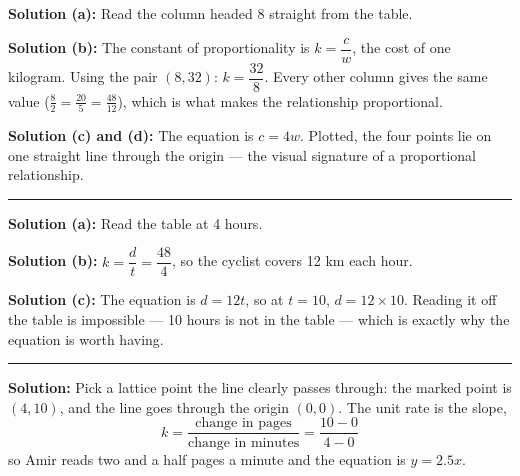 \documentclass[12pt]{article}
\begin{document}




\textbf{Solution (a):} Read the column headed 8 straight from the table.

\textbf{Solution (b):} The constant of proportionality is $k = \dfrac{c}{w}$, the cost
of one kilogram. Using the pair $(8, 32)$: $k = \dfrac{32}{8}$. Every other column
gives the same value ($\tfrac{8}{2} = \tfrac{20}{5} = \tfrac{48}{12}$), which is what
makes the relationship proportional.

\textbf{Solution (c) and (d):} The equation is $c = 4w$. Plotted, the four points
lie on one straight line through the origin --- the visual signature of a
proportional relationship.

\vspace{0.2cm}\noindent\rule{\linewidth}{0.2pt}


\textbf{Solution (a):} Read the table at 4 hours.

\textbf{Solution (b):} $k = \dfrac{d}{t} = \dfrac{48}{4}$, so the cyclist covers
12 km each hour.

\textbf{Solution (c):} The equation is $d = 12t$, so at $t = 10$,
$d = 12 \times 10$. Reading it off the table is impossible --- 10 hours is not in the
table --- which is exactly why the equation is worth having.

\vspace{0.2cm}\noindent\rule{\linewidth}{0.2pt}


\textbf{Solution:} Pick a lattice point the line clearly passes through: the marked
point is $(4, 10)$, and the line goes through the origin $(0,0)$. The unit rate is
the slope,
\[
  k = \frac{\text{change in pages}}{\text{change in minutes}} = \frac{10 - 0}{4 - 0}
\]
so Amir reads two and a half pages a minute and the equation is $y = 2.5x$.
\end{document}

